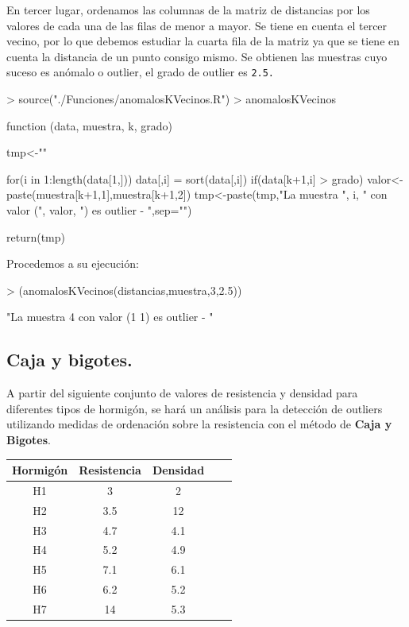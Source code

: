 \documentclass [a4paper] {article}
\begin{document}
\bigskip
En tercer lugar, ordenamos las columnas de la matriz de distancias por los valores de cada una de
las filas de menor a mayor. Se tiene en cuenta el tercer vecino, por lo que debemos estudiar la cuarta 
fila de la matriz ya que se tiene en cuenta la distancia de un punto consigo mismo. Se obtienen las 
muestras cuyo suceso es anómalo o outlier, el grado de outlier es \texttt{2.5.}
\begin{Schunk}
\begin{Sinput}
> source("./Funciones/anomalosKVecinos.R")
> anomalosKVecinos
\end{Sinput}
\begin{Soutput}
function (data, muestra, k, grado) {
    tmp<-""

    for(i in 1:length(data[1,])){
        data[,i] = sort(data[,i])
        if(data[k+1,i] > grado) {
            valor<-paste(muestra[k+1,1],muestra[k+1,2])
            tmp<-paste(tmp,"La muestra ", i, 
                " con valor (", valor, ") es outlier - ",sep="")
        }
    }

    return(tmp)
}
\end{Soutput}
\end{Schunk}

\bigskip
Procedemos a su ejecución:
\begin{Schunk}
\begin{Sinput}
> (anomalosKVecinos(distancias,muestra,3,2.5))
\end{Sinput}
\begin{Soutput}
[1] "La muestra 4 con valor (1 1) es outlier - "
\end{Soutput}
\end{Schunk}

\subsection{Caja y bigotes.}
\bigskip
A partir del siguiente conjunto de valores de resistencia y densidad para diferentes tipos de hormigón,
se hará un análisis para la detección de outliers utilizando medidas de ordenación sobre la resistencia
con el método de \textbf{Caja y Bigotes}.

\begin{table}[H]
\begin{center}
\begin{tabular}{|c|c|c|c|c|}
\hline
Hormigón & Resistencia & Densidad\\
\hline \hline
H1 & 3 & 2 \\ \hline
H2 & 3.5 & 12 \\ \hline
H3 & 4.7 & 4.1 \\ \hline
H4 & 5.2 & 4.9 \\ \hline
H5 & 7.1 & 6.1 \\ \hline
H6 & 6.2 & 5.2 \\ \hline
H7 & 14 & 5.3 \\ \hline
\end{tabular}
\end{center}
\end{table}
\end{document}
